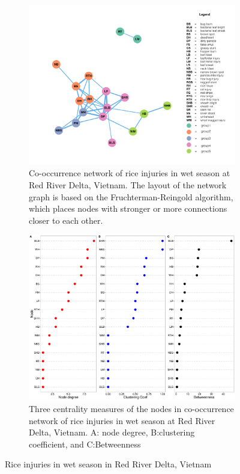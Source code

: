 \begin{figure}
    \centering
    \begin{subfigure}[b]{1\textwidth}
        \includegraphics[width = 1\textwidth]{figures/networkRR_ws/networkRR_ws.pdf}
        \caption{Co-occurrence network of rice injuries in wet season at Red River Delta, Vietnam. The layout of the network graph is based on the Fruchterman-Reingold algorithm, which places nodes with stronger or more connections closer to each other.}
        \label{fig:networkRR_ws}
    \end{subfigure}
    \begin{subfigure}[b]{1\textwidth}
        \includegraphics[width = 1\textwidth]{figures/nodepropRR_ws/nodepropRR_ws.pdf}
        \caption{Three centrality measures of the nodes in co-occurrence network of rice injuries in wet season at Red River Delta, Vietnam. A: node degree, B:clustering coefficient, and C:Betweenness}
        \label{fig:nodepropRR_ws}
    \end{subfigure}
    \caption{Rice injuries in wet season in Red River Delta, Vietnam}
    \label{fig:RR_ws}
\end{figure}


